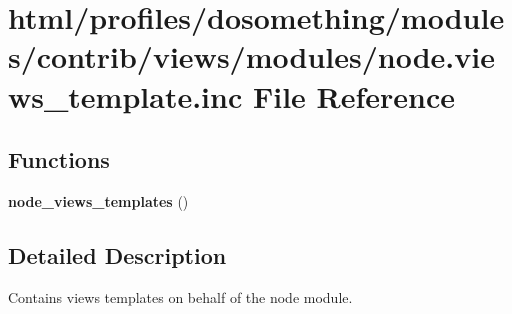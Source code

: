 \hypertarget{node_8views__template_8inc}{
\section{html/profiles/dosomething/modules/contrib/views/modules/node.views\_\-template.inc File Reference}
\label{node_8views__template_8inc}
}
\subsection*{Functions}
\begin{DoxyCompactItemize}
\item 
\hypertarget{node_8views__template_8inc_ac6829b9991db56d870920b2322daa2c8}{
{\bfseries node\_\-views\_\-templates} ()}
\label{node_8views__template_8inc_ac6829b9991db56d870920b2322daa2c8}

\end{DoxyCompactItemize}


\subsection{Detailed Description}
Contains views templates on behalf of the node module. 